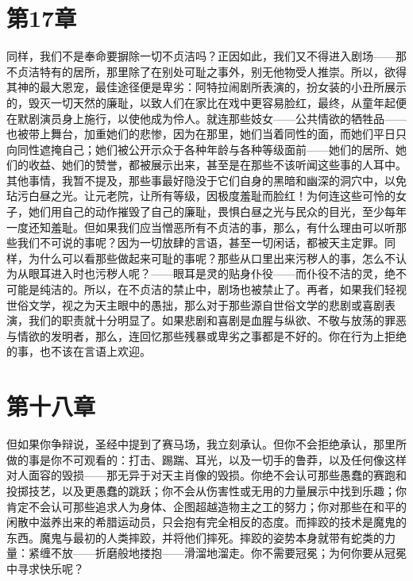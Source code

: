 
\section{第17章}

同样，我们不是奉命要摒除一切不贞洁吗？正因如此，我们又不得进入剧场——那不贞洁特有的居所，那里除了在别处可耻之事外，别无他物受人推崇。所以，欲得其神的最大恩宠，最佳途径便是卑劣：阿特拉闹剧所表演的，扮女装的小丑所展示的，毁灭一切天然的廉耻，以致人们在家比在戏中更容易脸红，最终，从童年起便在默剧演员身上施行，以使他成为伶人。就连那些妓女——公共情欲的牺牲品——也被带上舞台，加重她们的悲惨，因为在那里，她们当着同性的面，而她们平日只向同性遮掩自己；她们被公开示众于各种年龄与各种等级面前——她们的居所、她们的收益、她们的赞誉，都被展示出来，甚至是在那些不该听闻这些事的人耳中。其他事情，我暂不提及，那些事最好隐没于它们自身的黑暗和幽深的洞穴中，以免玷污白昼之光。让元老院，让所有等级，因极度羞耻而脸红！为何连这些可怜的女子，她们用自己的动作摧毁了自己的廉耻，畏惧白昼之光与民众的目光，至少每年一度还知羞耻。但如果我们应当憎恶所有不贞洁的事，那么，有什么理由可以听那些我们不可说的事呢？因为一切放肆的言语，甚至一切闲话，都被天主定罪。同样，为什么可以看那些做起来可耻的事呢？那些从口里出来污秽人的事，怎么不认为从眼耳进入时也污秽人呢？——眼耳是灵的贴身仆役——而仆役不洁的灵，绝不可能是纯洁的。所以，在不贞洁的禁止中，剧场也被禁止了。再者，如果我们轻视世俗文学，视之为天主眼中的愚拙，那么对于那些源自世俗文学的悲剧或喜剧表演，我们的职责就十分明显了。如果悲剧和喜剧是血腥与纵欲、不敬与放荡的罪恶与情欲的发明者，那么，连回忆那些残暴或卑劣之事都是不好的。你在行为上拒绝的事，也不该在言语上欢迎。\par


\section{第十八章}

但如果你争辩说，圣经中提到了赛马场，我立刻承认。但你不会拒绝承认，那里所做的事是你不可观看的：打击、踢踹、耳光，以及一切手的鲁莽，以及任何像这样对人面容的毁损——那无异于对天主肖像的毁损。你绝不会认可那些愚蠢的赛跑和投掷技艺，以及更愚蠢的跳跃；你不会从伤害性或无用的力量展示中找到乐趣；你肯定不会认可那些追求人为身体、企图超越造物主之工的努力；你对那些在和平的闲散中滋养出来的希腊运动员，只会抱有完全相反的态度。而摔跤的技术是魔鬼的东西。魔鬼与最初的人类摔跤，并将他们摔死。摔跤的姿势本身就带有蛇类的力量：紧缠不放——折磨般地搂抱——滑溜地溜走。你不需要冠冕；为何你要从冠冕中寻求快乐呢？\par

